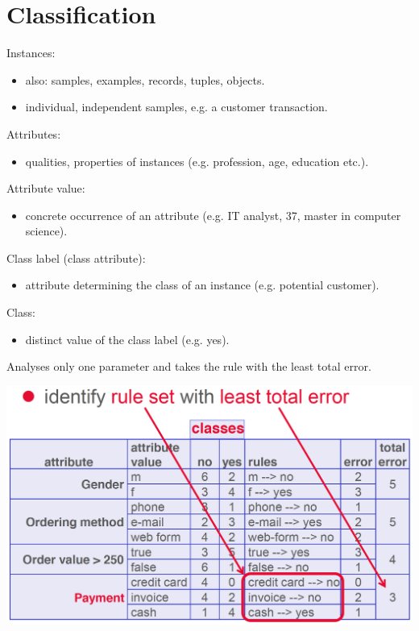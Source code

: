 \section{Classification}

\begin{breakbox}
\newline Instances:
\begin{itemize}
	\item also: samples, examples, records, tuples, objects.
	\item individual, independent samples, e.g. a customer transaction.
\end{itemize}
 Attributes:
\begin{itemize}
	\item qualities, properties of instances (e.g. profession, age, education etc.).
\end{itemize}
 Attribute value:
\begin{itemize}
	\item concrete occurrence of an attribute (e.g. IT analyst, 37, master in computer science).
\end{itemize}
Class label (class attribute):
\begin{itemize}
	\item attribute determining the class of an instance (e.g. potential customer).
\end{itemize}
Class:
\begin{itemize}
	\item distinct value of the class label (e.g. yes).
\end{itemize}
\end{breakbox}

\begin{breakbox}
Analyses only one parameter and takes the rule with the least total
error.
\begin{center}
\includegraphics[width=.15\textwidth]{slides_images/1r_algorithm}
\end{center}
\end{breakbox}

